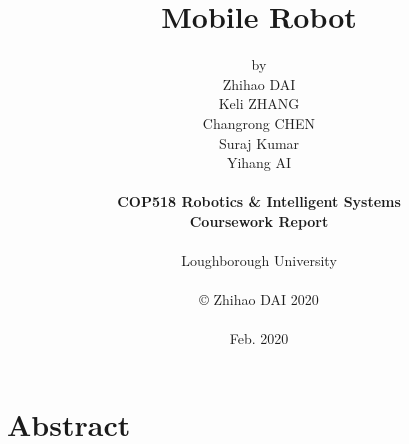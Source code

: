 \title{\bf Mobile Robot}

\author{by\\Zhihao DAI\\
Keli ZHANG\\
Changrong CHEN\\
Suraj Kumar\\
Yihang AI\\
\\
{\bf COP518 Robotics \& Intelligent Systems}\\
{\bf Coursework Report}\\
\\
Loughborough University\\
\\
\copyright
\hspace{1 dd} Zhihao DAI 2020\\
\\
Feb. 2020
}
\date{} %

\maketitle


% 
% 

\chapter*{Abstract}


